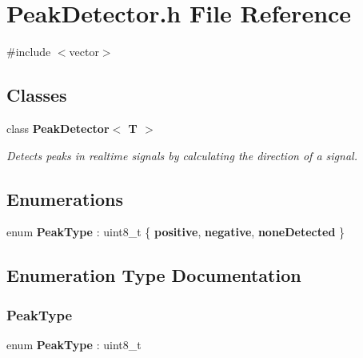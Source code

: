 \section{Peak\+Detector.\+h File Reference}
\label{_peak_detector_8h}
{\ttfamily \#include $<$vector$>$}\newline
\subsection*{Classes}
\begin{DoxyCompactItemize}
\item 
class \textbf{ Peak\+Detector$<$ T $>$}
\begin{DoxyCompactList}\small\item\em Detects peaks in realtime signals by calculating the direction of a signal. \end{DoxyCompactList}\end{DoxyCompactItemize}
\subsection*{Enumerations}
\begin{DoxyCompactItemize}
\item 
enum \textbf{ Peak\+Type} \+: uint8\+\_\+t \{ \textbf{ positive}, 
\textbf{ negative}, 
\textbf{ none\+Detected}
 \}
\end{DoxyCompactItemize}


\subsection{Enumeration Type Documentation}
\mbox{\label{_peak_detector_8h_a4791e14c9f62a95fdf58cd8b41ca6a08}} 
\subsubsection{Peak\+Type}
{\footnotesize\ttfamily enum \textbf{ Peak\+Type} \+: uint8\+\_\+t}

